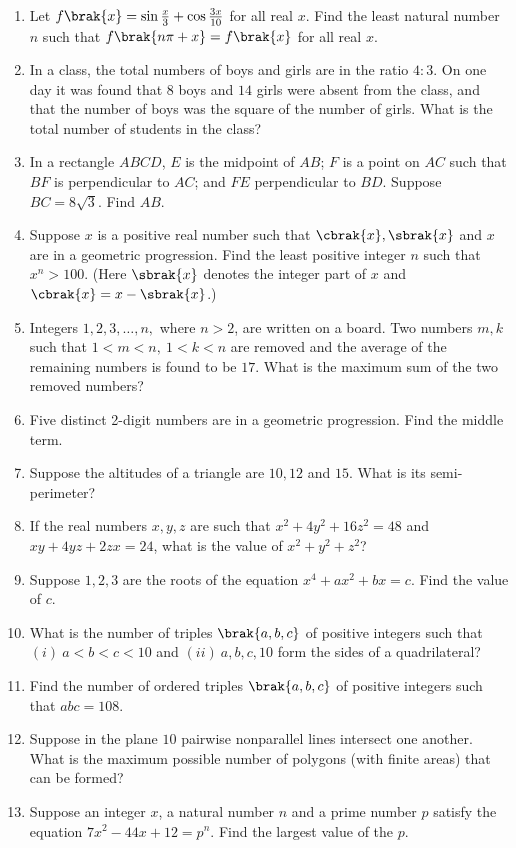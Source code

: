 \documentclass{article}
\begin{document}
\begin{enumerate}
\item Let $f\brak{x}=\sin\frac{x}{3}+\cos\frac{3x}{10}$ for all real $x$. Find the least natural number $n$ such that $f\brak{n\pi+x}=f\brak{x}$ for all real $x$.
\item In a class, the total numbers of boys and girls are in the ratio $4:3$. On one day it was found that $8$ boys and $14$ girls were absent from the class, and that the number of boys was the square of the number of girls. What is the total number of students in the class?
\item In a rectangle $ABCD$, $E$ is the midpoint of $AB$; $F$ is a point on $AC$ such that $BF$ is perpendicular to $AC$; and $FE$ perpendicular to $BD$. Suppose $BC = 8\sqrt{3}$. Find $AB$.
\item Suppose $x$ is a positive real number such that $\cbrak{x}, \sbrak{x}$ and $x$ are in a geometric progression. Find the least positive integer $n$ such that $x^{n}>100$. (Here $\sbrak{x}$ denotes the integer part of $x$ and $\cbrak{x}=x-\sbrak{x}$.) 
\item Integers $1, 2, 3,\ldots,n,$ where $n>2$, are written on a board. Two numbers $m,k$ such that $1<m<n,\ 1<k<n$ are removed and the average of the remaining numbers is found to be $17$. What is the maximum sum of the two removed numbers?
\item Five distinct 2-digit numbers are in a geometric progression. Find the middle term.
\item Suppose the altitudes of a triangle are $10, 12$ and $15$. What is its semi-perimeter?
\item If the real numbers $x,y,z$ are such that $x^2+4y^2+16z^2 = 48$ and $xy+4yz+2zx = 24$, what is the value of $x^2+y^2+z^2$?
\item Suppose $1,2,3$ are the roots of the equation $x^4+ax^2+bx=c$. Find the value of $c$.
\item What is the number of triples $\brak{a, b, c}$ of positive integers such that $(i)\ a<b<c<10$ and $(ii)\ a,b,c,10$ form the sides of a quadrilateral?
\item Find the number of ordered triples $\brak{a, b, c}$ of positive integers such that $abc = 108$.
\item Suppose in the plane $10$ pairwise nonparallel lines intersect one another. What is the maximum possible number of polygons (with finite areas) that can be formed?
\item Suppose an integer $x$, a natural number $n$ and a prime number $p$ satisfy the equation $7x^2-44x+12=p^n$. Find the largest value of the $p$.

\end{enumerate}
\end{document}
